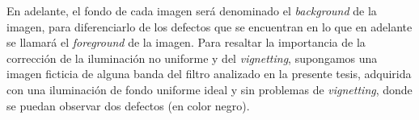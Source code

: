 	\begin{figure}[H]
		\begin{floatrow}
		\end{floatrow}
	\end{figure}
	
En adelante, el fondo de cada imagen será denominado el \textit{background} de la imagen, para diferenciarlo de los defectos que se encuentran en lo que en adelante se llamará el \textit{foreground} de la imagen. Para resaltar la importancia de la corrección de la iluminación no uniforme y del \textit{vignetting}, supongamos una imagen ficticia de alguna banda del filtro analizado en la presente tesis, adquirida con una iluminación de fondo uniforme ideal y sin problemas de \textit{vignetting}, donde se puedan observar dos defectos (en color negro).

